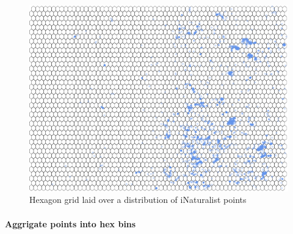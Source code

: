 \documentclass[
]{article}
\begin{document}
\begin{figure}
\centering
\includegraphics{Earth_Lab_application_files/figure-latex/unnamed-chunk-7-1.pdf}
\caption{Hexagon grid laid over a distribution of iNaturalist points}
\end{figure}

\hypertarget{aggrigate-points-into-hex-bins}{%
\paragraph{Aggrigate points into hex
bins}\label{aggrigate-points-into-hex-bins}}
\end{document}
